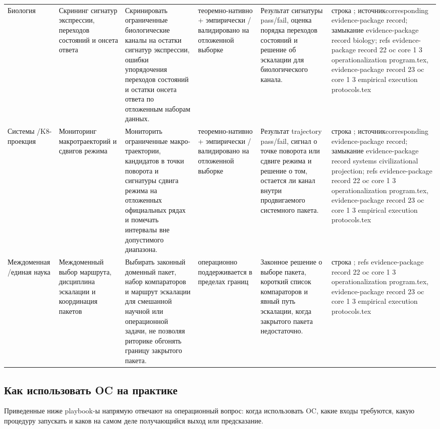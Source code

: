 \begin{longtable}{@{}L{0.11\textwidth}L{0.16\textwidth}L{0.19\textwidth}L{0.12\textwidth}L{0.18\textwidth}L{0.16\textwidth}@{}}
Биология & Скрининг сигнатур экспрессии, переходов состояний и онсета ответа & Скринировать ограниченные биологические каналы на остатки сигнатур экспрессии, ошибки упорядочения переходов состояний и остатки онсета ответа по отложенным наборам данных. & теоремно-нативно + эмпирически / валидировано на отложенной выборке & Результат сигнатуры pass/fail, оценка порядка переходов состояний и решение об эскалации для биологического канала. & строка ; \allowbreak источникcorresponding evidence-package record; \allowbreak замыкание evidence-package record biology; \allowbreak refs evidence-package record 22 oc core 1 3 operationalization program.tex, \allowbreak evidence-package record 23 oc core 1 3 empirical execution protocols.tex \\
Системы /\allowbreak K8-проекция & Мониторинг макротраекторий и сдвигов режима & Мониторить ограниченные макро-траектории, кандидатов в точки поворота и сигнатуры сдвига режима на отложенных официальных рядах и помечать интервалы вне допустимого диапазона. & теоремно-нативно + эмпирически / валидировано на отложенной выборке & Результат trajectory pass/fail, сигнал о точке поворота или сдвиге режима и решение о том, остается ли канал внутри продвигаемого системного пакета. & строка ; \allowbreak источникcorresponding evidence-package record; \allowbreak замыкание evidence-package record systems civilizational projection; \allowbreak refs evidence-package record 22 oc core 1 3 operationalization program.tex, \allowbreak evidence-package record 23 oc core 1 3 empirical execution protocols.tex \\
Междоменная /\allowbreak единая наука & Междоменный выбор маршрута, дисциплина эскалации и координация пакетов & Выбирать законный доменный пакет, набор компараторов и маршрут эскалации для смешанной научной или операционной задачи, не позволяя риторике обгонять границу закрытого пакета. & операционно поддерживается в пределах границ & Законное решение о выборе пакета, короткий список компараторов и явный путь эскалации, когда закрытого пакета недостаточно. & строка ; \allowbreak refs evidence-package record 22 oc core 1 3 operationalization program.tex, \allowbreak evidence-package record 23 oc core 1 3 empirical execution protocols.tex \\
\bottomrule
\end{longtable}
\endgroup

\subsection{Как использовать OC на практике}
Приведенные ниже playbook-ы напрямую отвечают на операционный вопрос: когда использовать OC, какие входы требуются, какую процедуру запускать и каков на самом деле получающийся выход или предсказание.

